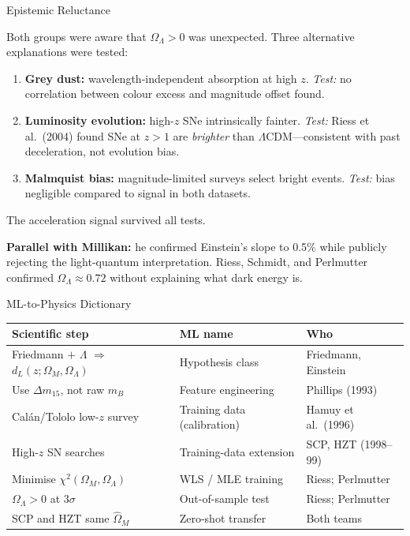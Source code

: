 \documentclass[aspectratio=169]{beamer}
\begin{document}
\begin{frame}{Epistemic Reluctance}

Both groups were aware that $\Omega_\Lambda > 0$ was unexpected.
Three alternative explanations were tested:

\begin{enumerate}
  \item \textbf{Grey dust:} wavelength-independent absorption at high $z$.
    \emph{Test:} no correlation between colour excess and magnitude
    offset found.

  \item \textbf{Luminosity evolution:} high-$z$ SNe intrinsically
    fainter.
    \emph{Test:} Riess et al.\ (2004) found SNe at $z > 1$ are
    \emph{brighter} than $\Lambda$CDM---consistent with past
    deceleration, not evolution bias.

  \item \textbf{Malmquist bias:} magnitude-limited surveys select
    bright events.
    \emph{Test:} bias negligible compared to signal in both datasets.
\end{enumerate}

\medskip
The acceleration signal survived all tests.

\medskip
\textbf{Parallel with Millikan:} he confirmed Einstein's slope to 0.5\%
while publicly rejecting the light-quantum interpretation.
Riess, Schmidt, and Perlmutter confirmed $\Omega_\Lambda \approx 0.72$
without explaining what dark energy is.

\end{frame}

\begin{frame}{ML-to-Physics Dictionary}

\begin{center}
\small
\begin{tabular}{p{5.0cm}p{4.5cm}p{2.5cm}}
\toprule
\textbf{Scientific step} & \textbf{ML name} & \textbf{Who} \\
\midrule
Friedmann $+$ $\Lambda$ $\Rightarrow$ $d_L(z;\Omega_M,\Omega_\Lambda)$
  & Hypothesis class & Friedmann, Einstein \\
Use $\Delta m_{15}$, not raw $m_B$
  & Feature engineering & Phillips (1993) \\
Cal\'an/Tololo low-$z$ survey
  & Training data (calibration) & Hamuy et al.\ (1996) \\
High-$z$ SN searches
  & Training-data extension & SCP, HZT (1998--99) \\
Minimise $\chi^2(\Omega_M,\Omega_\Lambda)$
  & WLS / MLE training & Riess; Perlmutter \\
$\Omega_\Lambda > 0$ at $3\sigma$
  & Out-of-sample test & Riess; Perlmutter \\
SCP and HZT same $\hat\Omega_M$
  & Zero-shot transfer & Both teams \\
\bottomrule
\end{tabular}
\end{center}

\end{frame}
\end{document}
